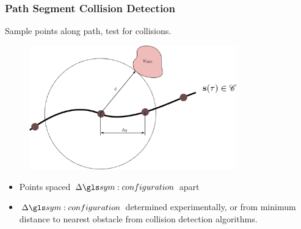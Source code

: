 \documentclass{beamer}
\begin{document}
	\begin{frame}
		\frametitle{Path Segment Collision Detection}

		Sample points along path, test for collisions.

		\begin{figure}
			\includegraphics[width=0.8\textwidth]{path_collision_detection}
		\end{figure}

		\begin{itemize}

			\item

				Points spaced $\Delta \configuration$ apart

			\item

				$\Delta\configuration$ determined experimentally, or from
				minimum distance to nearest obstacle from collision detection
				algorithms.

		\end{itemize}
	\end{frame}
\end{document}
